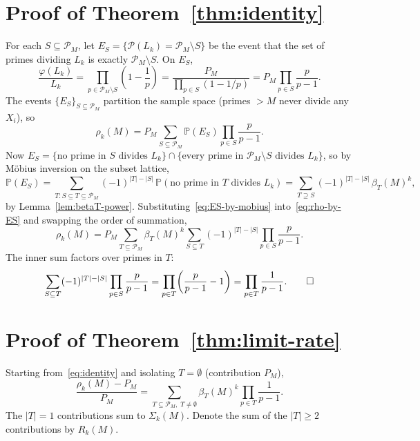 \documentclass[11pt]{article}
\theoremstyle{remark}
\newcommand{\PP}{\mathbb{P}}
\newcommand{\PM}{\mathcal{P}_M}
\begin{document}
\section{Proof of Theorem~\ref{thm:identity}}\label{sec:thm1}

For each $S \subseteq \PM$, let $E_S = \{\mathcal{P}(L_k) = \PM \setminus S\}$ be the event that the set of primes dividing $L_k$ is exactly $\PM \setminus S$. On $E_S$,
\begin{equation}\label{eq:phi-over-L-on-ES}
\frac{\varphi(L_k)}{L_k} = \prod_{p \in \PM \setminus S}\!\left(1 - \frac{1}{p}\right) = \frac{P_M}{\prod_{p \in S}(1 - 1/p)} = P_M \prod_{p \in S} \frac{p}{p-1}.
\end{equation}
The events $\{E_S\}_{S \subseteq \PM}$ partition the sample space (primes $> M$ never divide any $X_i$), so
\begin{equation}\label{eq:rho-by-ES}
\rho_k(M) = P_M \sum_{S \subseteq \PM} \PP(E_S) \prod_{p \in S} \frac{p}{p-1}.
\end{equation}
Now $E_S = \{\text{no prime in $S$ divides $L_k$}\} \cap \{\text{every prime in $\PM \setminus S$ divides $L_k$}\}$, so by M\"obius inversion on the subset lattice,
\begin{equation}\label{eq:ES-by-mobius}
\PP(E_S) = \sum_{T \colon S \subseteq T \subseteq \PM} (-1)^{|T|-|S|}\, \PP(\text{no prime in $T$ divides $L_k$}) = \sum_{T \supseteq S} (-1)^{|T|-|S|}\, \beta_T(M)^k,
\end{equation}
by Lemma~\ref{lem:betaT-power}. Substituting~\eqref{eq:ES-by-mobius} into~\eqref{eq:rho-by-ES} and swapping the order of summation,
\[
\rho_k(M) = P_M \sum_{T \subseteq \PM} \beta_T(M)^k \sum_{S \subseteq T} (-1)^{|T|-|S|} \prod_{p \in S} \frac{p}{p-1}.
\]
The inner sum factors over primes in $T$:
\[
\sum_{S \subseteq T} (-1)^{|T|-|S|} \prod_{p \in S} \frac{p}{p-1} = \prod_{p \in T}\!\left(\frac{p}{p-1} - 1\right) = \prod_{p \in T} \frac{1}{p-1}. \qedhere
\]

\section{Proof of Theorem~\ref{thm:limit-rate}}\label{sec:thm2}

Starting from~\eqref{eq:identity} and isolating $T = \emptyset$ (contribution $P_M$),
\[
\frac{\rho_k(M) - P_M}{P_M} = \sum_{T \subseteq \PM,\; T \neq \emptyset} \beta_T(M)^k \prod_{p \in T} \frac{1}{p-1}.
\]
The $|T| = 1$ contributions sum to $\Sigma_k(M)$. Denote the sum of the $|T| \geq 2$ contributions by $R_k(M)$.
\end{document}
